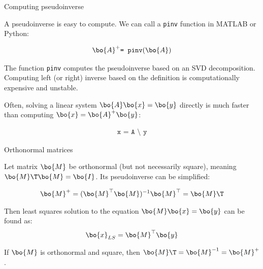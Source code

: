 \documentclass{beamer}
\begin{document}
\begin{frame}{Computing pseudoinverse}
	\begin{flushleft}
		
		A pseudoinverse is easy to compute. We can call a \texttt{pinv} function in MATLAB or Python:
	
	\begin{align*}
		\bo{A}^+ \texttt{= pinv}(\bo{A})
	\end{align*}
	
		\bigskip
	
		The function  \texttt{pinv}  computes the pseudoinverse based on an SVD decomposition. Computing left (or right) inverse based on the definition is computationally expensive and unstable.
		
		\bigskip
		
		Often, solving a linear system  $\bo{A}\bo{x} = \bo{y}$ directly is much faster than computing $\bo{x} = \bo{A}^+\bo{y}$:
		
		\begin{align*}
			\texttt{x = A \textbackslash \  y}
		\end{align*}
		
				
	\end{flushleft}
\end{frame}






\begin{frame}{Orthonormal matrices}
	\begin{flushleft}
		
		Let matrix $\bo{M}$ be orthonormal (but not necessarily square), meaning $\bo{M}\T \bo{M} = \bo{I}$. Its  pseudoinverse can be simplified:
		
		\begin{align}
			\bo{M}^+ = (\bo{M}^\top\bo{M})^{-1} \bo{M}^\top = \bo{M}\T
		\end{align}
	
		\bigskip
	
		Then least squares solution to the equation $\bo{M} \bo{x} = \bo{y}$ can be found as:
		\begin{align}
			\bo{x}_{LS} = \bo{M}^\top \bo{y}
		\end{align}
	
		If $\bo{M}$ is orthonormal and square, then $\bo{M}\T = \bo{M}^{-1} = \bo{M}^+$.
	
	
	\end{flushleft}
\end{frame}
\end{document}
